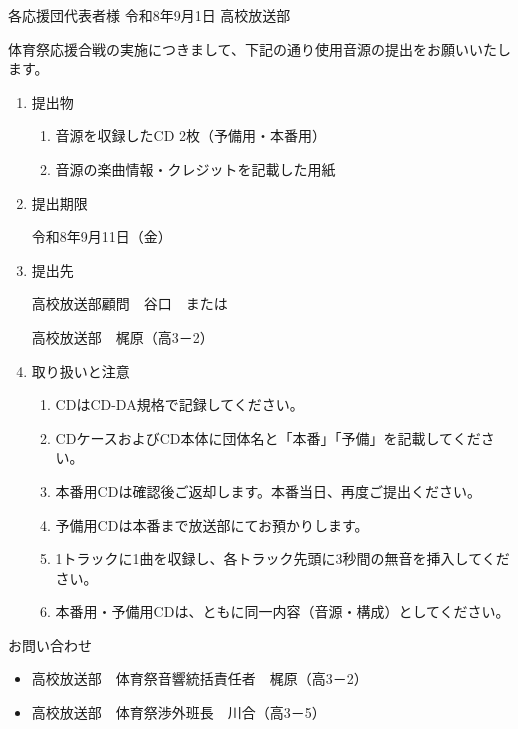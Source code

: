 \documentclass{ltjsarticle}
\begin{document}
\recipientinfo
{各応援団代表者様}
{令和8年9月1日}
{高校放送部}


\bodytext

体育祭応援合戦の実施につきまして、下記の通り使用音源の提出をお願いいたします。

\kicenter

\begin{enumerate}

\item 提出物

\begin{enumerate}
\item 音源を収録したCD 2枚（予備用・本番用）
\item 音源の楽曲情報・クレジットを記載した用紙
\end{enumerate}

\item 提出期限

令和8年9月11日（金）

\item 提出先

高校放送部顧問　谷口　または

高校放送部　梶原（高3－2）

\item 取り扱いと注意

\begin{enumerate}
\item CDはCD-DA規格で記録してください。
\item CDケースおよびCD本体に団体名と「本番」「予備」を記載してください。
\item 本番用CDは確認後ご返却します。本番当日、再度ご提出ください。
\item 予備用CDは本番まで放送部にてお預かりします。
\item 1トラックに1曲を収録し、各トラック先頭に3秒間の無音を挿入してください。
\item 本番用・予備用CDは、ともに同一内容（音源・構成）としてください。
\end{enumerate}

\end{enumerate}

\docend

お問い合わせ
\begin{itemize}
\item 高校放送部　体育祭音響統括責任者　梶原（高3－2）
\item 高校放送部　体育祭渉外班長　川合（高3－5）
\end{itemize}
\end{document}
